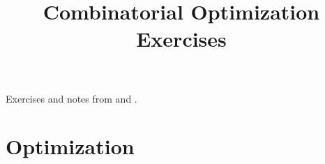 \documentclass{article}
\title{Combinatorial Optimization Exercises}
\begin{document}
\maketitle

Exercises and notes from \citet{combopt-pap} and \citet{schrijver-course}.

\section{Optimization}



\end{document}
